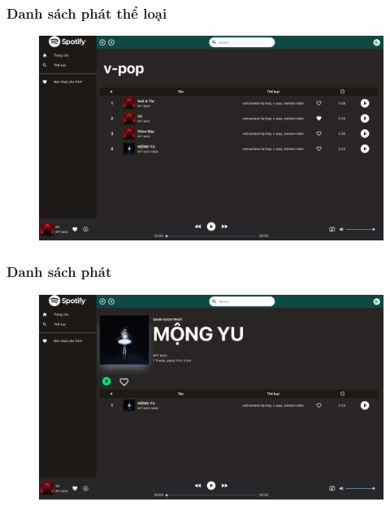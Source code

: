 \documentclass[a4paper]{article}
\begin{document}
\subsubsection{Danh sách phát thể loại}
\begin{figure}[h!]
\begin{center}
\includegraphics[width=12cm]{genres_playlist.png}
\end{center}
\end{figure}
\newpage

\subsubsection{Danh sách phát}
\begin{figure}[h!]
\begin{center}
\includegraphics[width=12cm]{playlist.png}
\end{center}
\end{figure}
\end{document}

